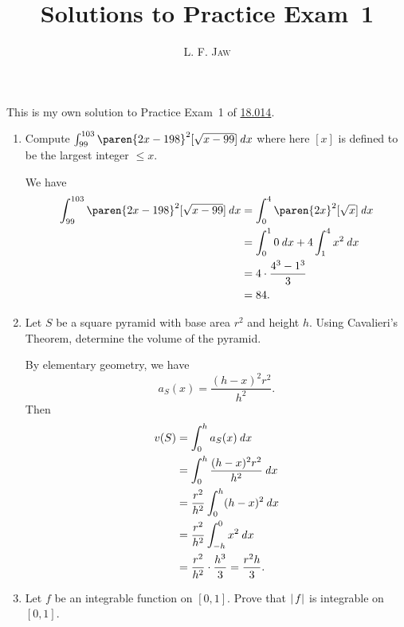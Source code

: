 \documentclass[a4paper]{article}
\title{Solutions to Practice Exam~1}
\author{L. F. \textsc{Jaw}}
\begin{document}
\maketitle

This is my own solution to Practice Exam~1 of
\href{https://ocw.mit.edu/courses/mathematics/18-014-calculus-with-theory-fall-2010/exams/}{18.014}.

\begin{enumerate}
\item Compute \(\int_{99}^{103} \paren{2x-198}^2 [\sqrt{x-99}] \dx\)
  where here \([x]\) is defined to be the largest integer \(\le x\).

  We have
  \begin{align*}
    \int_{99}^{103} \paren{2x-198}^2 [\sqrt{x-99}] \dx
      &= \int_0^4 \paren{2x}^2 [\sqrt x] \dx \\
      &= \int_0^1 0 \dx + 4 \int_1^4 x^2 \dx \\
      &= 4 \cdot \frac{4^3 - 1^3}{3} \\
      &= 84.
  \end{align*}

\item Let \(S\) be a square pyramid with base area \(r^2\) and height
  \(h\).  Using Cavalieri's Theorem, determine the volume of the
  pyramid.

  By elementary geometry, we have
  \[
    a_S(x) = \frac{(h-x)^2 r^2}{h^2}.
  \]
  Then
  \begin{align*}
    v(S) &= \int_0^h a_S(x) \mathop{}\!\mathit{d} x \\
         &= \int_0^h \frac{(h-x)^2 r^2}{h^2} \mathop{}\!\mathit{d} x \\
         &= \frac{r^2}{h^2} \int_0^h (h-x)^2 \mathop{}\!\mathit{d} x \\
         &= \frac{r^2}{h^2} \int_{-h}^0 x^2 \mathop{}\!\mathit{d} x \\
         &= \frac{r^2}{h^2} \cdot \frac{h^3}{3}
           = \frac{r^2 h}{3}.
  \end{align*}

\item Let \(f\) be an integrable function on \([0, 1]\).  Prove that
  \(\lvert\,f\rvert\) is integrable on \([0, 1]\).


\end{enumerate}
\end{document}

